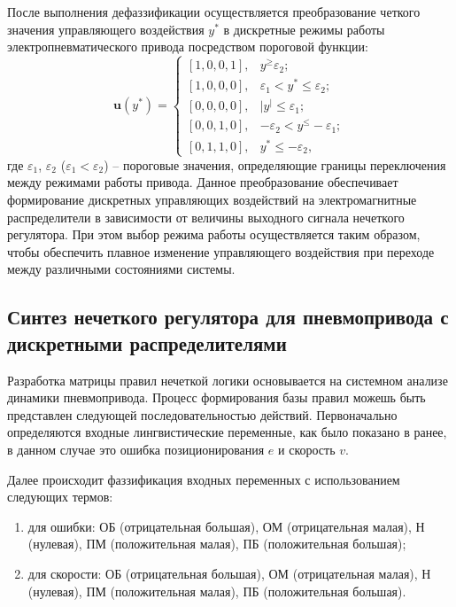 После выполнения дефаззификации осуществляется преобразование четкого значения управляющего воздействия
$y^*$ в дискретные режимы работы электропневматического привода посредством пороговой функции:
\begin{equation}
	\mathbf{u}(y^*) = \begin{cases}
		[1,0,0,1], & y^ \geq \varepsilon_2;                   \\
		[1,0,0,0], & \varepsilon_1 < y^* \leq \varepsilon_2;  \\
		[0,0,0,0], & |y^| \leq \varepsilon_1;                 \\
		[0,0,1,0], & -\varepsilon_2 < y^ \leq -\varepsilon_1; \\
		[0,1,1,0], & y^* \leq -\varepsilon_2,
	\end{cases}
\end{equation}
где $\varepsilon_1$, $\varepsilon_2$ ($\varepsilon_1 < \varepsilon_2$) -- пороговые значения, определяющие
границы переключения между режимами работы привода.
Данное преобразование обеспечивает формирование дискретных
управляющих воздействий на электромагнитные распределители в зависимости от
величины выходного сигнала нечеткого регулятора. При этом выбор
режима работы осуществляется таким образом, чтобы обеспечить плавное
изменение управляющего воздействия при переходе между различными состояниями системы.


\subsection*{Синтез нечеткого регулятора для пневмопривода с дискретными распределителями}\label{subsec:ch3/sec4/sub2}

Разработка матрицы правил нечеткой логики основывается на системном
анализе динамики пневмопривода. Процесс формирования базы правил можешь быть представлен
следующей последовательностью действий.
Первоначально определяются входные лингвистические переменные, как было показано в ранее, в данном случае это ошибка позиционирования $e$ и скорость $v$.

Далее происходит фаззификация входных переменных с использованием следующих термов:
\begin{enumerate}
	\item для ошибки: {ОБ (отрицательная большая),
	      ОМ (отрицательная малая),
	      Н (нулевая),
	      ПМ (положительная малая),
	      ПБ (положительная большая)};

	\item для скорости: {ОБ (отрицательная большая),
	      ОМ (отрицательная малая),
	      Н (нулевая),
	      ПМ (положительная малая),
	      ПБ (положительная большая)}.
\end{enumerate}

